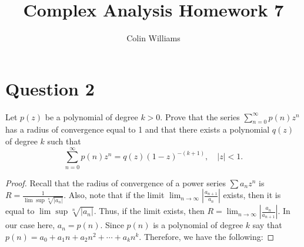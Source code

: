 \documentclass[10pt,a4paper]{article}
\title{Complex Analysis Homework 7}
\author{Colin Williams}
\theoremstyle{definition}
\begin{document}
\maketitle

\section*{Question 2}
Let $p(z)$ be a polynomial of degree $k > 0$. Prove that the series $\displaystyle \sum_{n = 0}^{\infty} p(n)z^n$ has a radius of convergence equal to 1 and that there exists a polynomial $q(z)$ of degree $k$ such that 
\[\sum_{n = 0}^{\infty} p(n)z^n = q(z)(1 - z)^{-(k + 1)}, \quad |z| < 1.\]

\begin{proof}
Recall that the radius of convergence of a power series $\sum a_n z^n$ is $\displaystyle R = \frac{1}{\lim \sup \sqrt[n]{|a_n|}}$. Also, note that if the limit $\lim_{n \to \infty} \left|\frac{a_{n + 1}}{a_n}\right|$ exists, then it is equal to $\lim \sup \sqrt[n]{|a_n|}$. Thus, if the limit exists, then $R = \lim_{n \to \infty} \left|\frac{a_n}{a_{n+1}}\right|$. In our case here, $a_n = p(n)$. Since $p(n)$ is a polynomial of degree $k$ say that $p(n) = a_0 + a_1n + a_2n^2 + \cdots + a_kn^k$. Therefore, we have the following:


\end{proof}
\end{document}

